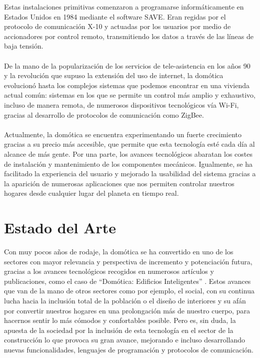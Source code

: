 Estas instalaciones primitivas comenzaron a programarse informáticamente en Estados Unidos en 1984 mediante el software SAVE. Eran regidas por el protocolo de comunicación X-10 y actuadas por los usuarios por medio de accionadores por control remoto, transmitiendo los datos a través de las líneas de baja tensión. \\\\
De la mano de la popularización de los servicios de tele-asistencia en los años 90 y la revolución que supuso la extensión del uso de internet, la domótica evolucionó hasta los complejos sistemas que podemos encontrar en una vivienda actual común: sistemas en los que se permite un control más amplio y exhaustivo, incluso de manera remota, de numerosos dispositivos tecnológicos vía Wi-Fi, gracias al desarrollo de protocolos de comunicación como ZigBee. \\\\
Actualmente, la domótica se encuentra experimentando un fuerte crecimiento gracias a su precio más accesible, que permite que esta tecnología esté cada día al alcance de más gente. Por una parte, los avances tecnológicos abaratan los costes de instalación y mantenimiento de los componentes mecánicos. Igualmente, se ha facilitado la experiencia del usuario y mejorado la usabilidad del sistema gracias a la aparición de numerosas aplicaciones que nos permiten controlar nuestros hogares desde cualquier lugar del planeta en tiempo real. 


\section{Estado del Arte}
Con muy pocos años de rodaje, la domótica se ha convertido en uno de los sectores con mayor relevancia y perspectiva de incremento y potenciación futura, gracias a los avances tecnológicos recogidos en numerosos artículos y publicaciones, como el caso de “Domótica: Edificios Inteligentes” \cite{EI:2004}. Estos avances que van de la mano de otros sectores como por ejemplo, el social, con su continua lucha hacia la inclusión total de la población o el diseño de interiores y su afán por convertir nuestros hogares en una prolongación más de nuestro cuerpo, para hacernos sentir lo más cómodos y confortables posible. Pero es, sin duda, la apuesta de la sociedad por la inclusión de esta tecnología en el sector de la construcción lo que provoca su gran avance, mejorando e incluso desarrollando nuevas funcionalidades, lenguajes de programación y protocolos de comunicación.\\\\

